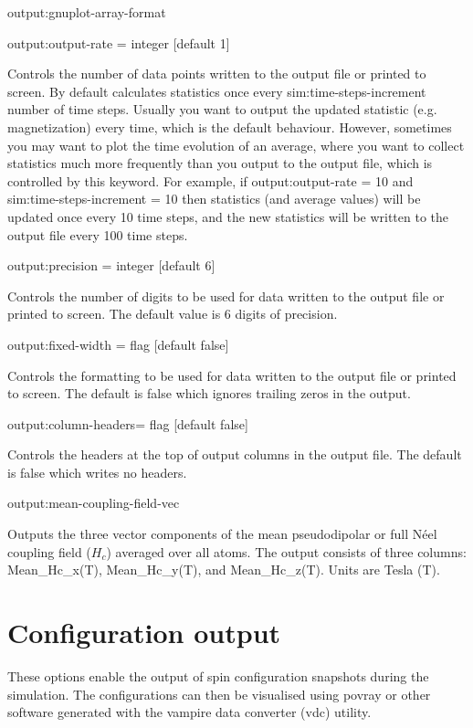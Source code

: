 {\zicf output:gnuplot-array-format}

{\zicf output:output-rate = integer [default 1]} Controls the number of data points written to the output file or printed to screen. By default \vampire calculates statistics once every sim:time-steps-increment number of time steps. Usually you want to output the updated statistic (e.g. magnetization) every time, which is the default behaviour. However, sometimes you may want to plot the time evolution of an average, where you want to collect statistics much more frequently than you output to the output file, which is controlled by this keyword. For example, if output:output-rate = 10 and sim:time-steps-increment = 10 then statistics (and average values) will be updated once every 10 time steps, and the new statistics will be written to the output file every 100 time steps.

{\zicf output:precision = integer [default 6]} Controls the number of digits to be used for data written to the output file or printed to screen. The default value is 6 digits of precision.

{\zicf output:fixed-width = flag [default false]} Controls the formatting to be used for data written to the output file or printed to screen. The default is false which ignores trailing zeros in the output.

{\zicf output:column-headers= flag [default false]} Controls the headers at the top of output columns in the output file. The default is false which writes no headers.

{\zicf output:mean-coupling-field-vec}Outputs the three vector components of the mean pseudodipolar or full N\'eel coupling field ($H_c$) averaged over all atoms. The output consists of three columns: Mean\_Hc\_x(T), Mean\_Hc\_y(T), and Mean\_Hc\_z(T). Units are Tesla (T).


\section*{Configuration output}
 These options enable the output of spin configuration snapshots during the simulation. The configurations can then be visualised using povray or other software generated with the vampire data converter (vdc) utility.

